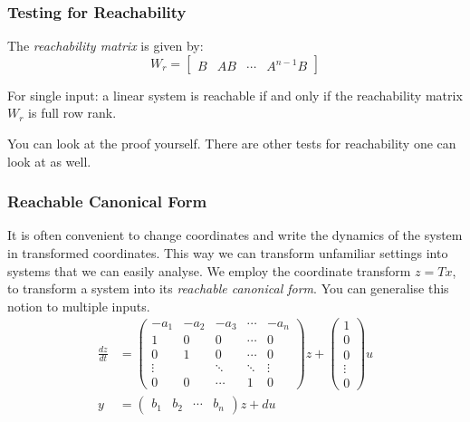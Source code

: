 \documentclass{beamer}
\theoremstyle{remark}
\begin{document}
\begin{frame}
\frametitle{Testing for Reachability}
\begin{definition}
The \textsl{reachability matrix} is given by: 
\begin{equation}
    W_r = 
    \begin{bmatrix}
        B & AB & \cdots & A^{n-1}B
    \end{bmatrix}
\end{equation}
\end{definition}
\begin{theorem}
    For single input: a linear system is reachable if and only if the reachability matrix $W_r$ is full row rank.
\end{theorem}
You can look at the proof yourself.
There are other tests for reachability one can look at as well.
\end{frame}

\begin{frame}
\frametitle{Reachable Canonical Form}
It is often convenient to change coordinates and write the dynamics of the system in transformed coordinates. 
This way we can transform unfamiliar settings into systems that we can easily analyse. 
We employ the coordinate transform $z=Tx$, to transform a system into its \textsl{reachable canonical form}. 
You can generalise this notion to multiple inputs.
\begin{equation}
\begin{aligned}
\frac{dz}{dt}
&=
\begin{pmatrix}
-a_1 & -a_2 & -a_3 & \cdots & -a_n \\
1 & 0 & 0 & \cdots & 0 \\
0 & 1 & 0 & \cdots & 0 \\
\vdots & & \ddots & \ddots & \vdots \\
0 & 0 & \cdots & 1 & 0
\end{pmatrix}
z
+
\begin{pmatrix}
1 \\ 0 \\ 0 \\ \vdots \\ 0
\end{pmatrix}
u \\
y &= 
\begin{pmatrix}
    b_1 & b_2 & \cdots & b_n
\end{pmatrix}
z + du
\end{aligned}
\end{equation}
\end{frame}
\end{document}
